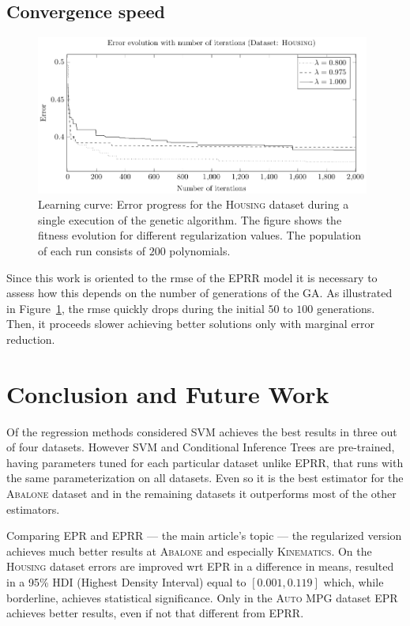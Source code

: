 \documentclass[review,preprint]{elsarticle}
\begin{document}
\subsection{Convergence speed}
%
\begin{figure}[tb]
	\begin{center}
		\includegraphics[width=0.98\textwidth]{Fig4xx.pdf}
		\caption{Learning curve: Error progress for the \textsc{Housing} dataset during a single execution of the genetic algorithm. The figure shows the fitness evolution for different regularization values. The population of each run consists of $200$ polynomials.}
		\label{Abalone_fitnessProgress}
	\end{center}
\end{figure}
%
Since this work is oriented to the \ac{rmse} of the \ac{EPRR} model it is necessary to assess how this depends on the number of generations of the \ac{GA}. As illustrated in Figure~\ref{Abalone_fitnessProgress}, the \ac{rmse} quickly drops during the initial $50$ to $100$ generations. Then, it proceeds slower achieving better solutions only with marginal error reduction.

\section{Conclusion and Future Work}

Of the regression methods considered \ac{SVM} achieves the best results in three out of four datasets. However \ac{SVM} and Conditional Inference Trees are pre-trained, having parameters tuned for each particular dataset unlike \ac{EPRR}, that runs with the same parameterization on all datasets. Even so it is the best estimator for the \textsc{Abalone} dataset and in the remaining datasets it outperforms most of the other estimators. 

Comparing \ac{EPR} and \ac{EPRR} --- the main article's topic --- the regularized version achieves much better results at \textsc{Abalone} and especially \textsc{Kinematics}. On the \textsc{Housing} dataset errors are improved  wrt \ac{EPR} in a difference in means, resulted in a 95\% HDI (Highest Density Interval) equal to $\left\lbrack 0.001, 0.119 \right\rbrack$ which, while borderline, achieves statistical significance. Only in the \textsc{Auto MPG} dataset \ac{EPR} achieves better results, even if not that different from \ac{EPRR}.
\end{document}
